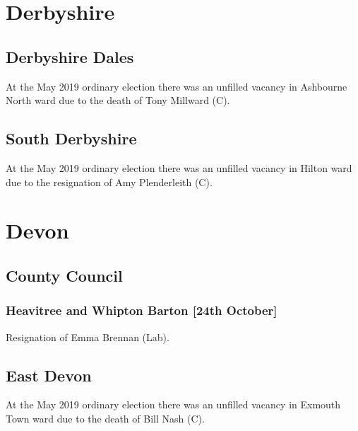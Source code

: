 \documentclass[a4paper,openany]{book}
\begin{document}
\begin{resultsiii}
\section{Derbyshire}

\subsection*{Derbyshire Dales}

At the May 2019 ordinary election there was an unfilled vacancy in Ashbourne North ward due to the death of Tony Millward (C).

\subsection*{South Derbyshire}

At the May 2019 ordinary election there was an unfilled vacancy in Hilton ward due to the resignation of Amy Plenderleith (C).

\section{Devon}

\subsection*{County Council}

\subsubsection*{Heavitree and Whipton Barton \hspace*{\fill}\nolinebreak[1]%
	\enspace\hspace*{\fill}
	[24th October]}


Resignation of Emma Brennan (Lab).

\subsection*{East Devon}

At the May 2019 ordinary election there was an unfilled vacancy in Exmouth Town ward due to the death of Bill Nash (C).


\end{resultsiii}
\end{document}
